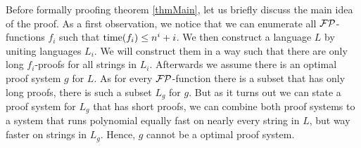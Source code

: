   Before formally proofing theorem \ref{thmMain}, let us briefly discuss the main idea of the proof. As a first observation, we notice that we can enumerate all \(\mathcal{FP}\)-functions \(f_i\) such that \(\operatorname{time}(f_i) \leq n^i + i\). We then construct a language \(L\) by uniting languages \(L_i\). We will construct them in a way such that there are only long \(f_i\)-proofs for all strings in \(L_i\). Afterwards we assume there is an optimal proof system \(g\) for \(L\). As for every \(\mathcal{FP}\)-function there is a subset that has only long proofs, there is such a subset \(L_g\) for \(g\). But as it turns out we can state a proof system for \(L_g\) that has short proofs, we can combine both proof systems to a system that runs polynomial equally fast on nearly every string in \(L\), but way faster on strings in \(L_g\). Hence, \(g\) cannot be a optimal proof system.
  
